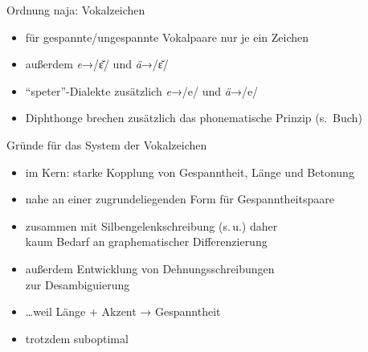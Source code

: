 \begin{frame}
  {Ordnung naja: Vokalzeichen}
  \pause
  \centering
    \Zeile
    \pause
    \begin{itemize}[<+->]
      \item \alert{für gespannte\slash ungespannte Vokalpaare nur je ein Zeichen}
      \item außerdem \textit{e}→/ɛ̆/ und \textit{ä}→/ɛ̆/
      \item "`speter"'-Dialekte zusätzlich \textit{e}→/e/ und \textit{ä}→/e/
        \Halbzeile
      \item \alert{Diphthonge} brechen zusätzlich das phonematische Prinzip (s.\ Buch)
    \end{itemize}
\end{frame}

\begin{frame}
  {Gründe für das System der Vokalzeichen}
  \pause
  \begin{itemize}[<+->]
    \item im Kern: \alert{starke Kopplung von Gespanntheit, Länge und Betonung}
    \item nahe an \alert{einer zugrundeliegenden Form} für Gespanntheitspaare
    \item zusammen mit \alert{Silbengelenkschreibung} (s.\,u.) daher\\
      kaum Bedarf an graphematischer Differenzierung
      \Halbzeile
    \item außerdem Entwicklung von \alert{Dehnungsschreibungen}\\
      zur Desambiguierung
    \item \ldots weil \alert{Länge + Akzent → Gespanntheit}
      \Halbzeile
    \item trotzdem suboptimal
  \end{itemize}
\end{frame}


